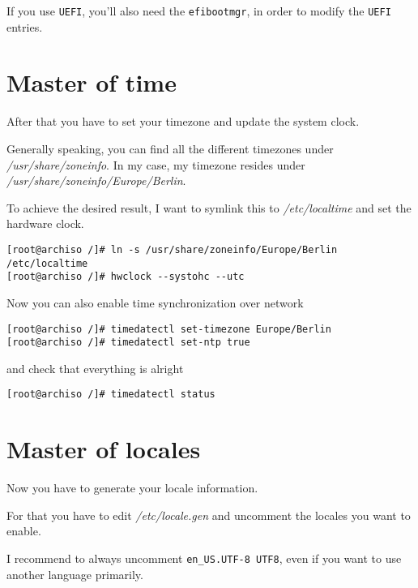 \documentclass[10pt]{dustdoc}
\begin{document}
If you use \texttt{UEFI}, you’ll also need the \texttt{efibootmgr}, in order to modify the \texttt{UEFI} entries.

\section{Master of time}
\label{sec:master-of-time}

After that you have to set your timezone and update the system clock.

Generally speaking, you can find all the different timezones under \textit{/usr/\allowbreak{}share/\allowbreak{}zoneinfo}.
In my case, my timezone resides under \textit{/usr/\allowbreak{}share/\allowbreak{}zoneinfo/\allowbreak{}Europe/\allowbreak{}Berlin}.

To achieve the desired result, I want to symlink this to \textit{/etc/localtime} and set the hardware clock.

\begin{verbatim}
[root@archiso /]# ln -s /usr/share/zoneinfo/Europe/Berlin /etc/localtime
[root@archiso /]# hwclock --systohc --utc
\end{verbatim}

Now you can also enable time synchronization over network

\begin{verbatim}
[root@archiso /]# timedatectl set-timezone Europe/Berlin
[root@archiso /]# timedatectl set-ntp true
\end{verbatim}

\noindent
and check that everything is alright

\begin{verbatim}
[root@archiso /]# timedatectl status
\end{verbatim}

\section{Master of locales}
\label{sec:master-of-locales}

Now you have to generate your locale information.

For that you have to edit \textit{/etc/locale.gen} and uncomment the locales you want to enable.

\begin{NOTE}
    I recommend to always uncomment \texttt{en\_US.UTF-8 UTF8}, even if you want to use another language primarily.
\end{NOTE}
\end{document}
